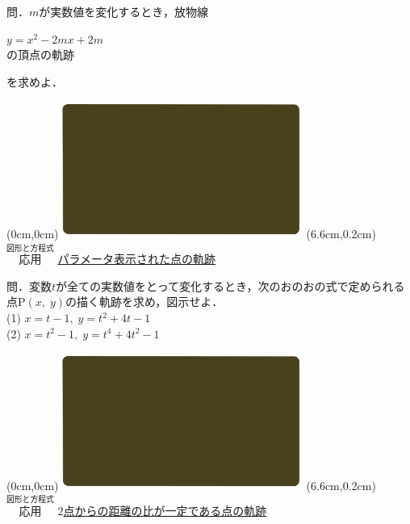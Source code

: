 \documentclass[10pt,
fleqn,
dvipdfmx,
uplatex
]{jsarticle}
\begin{document}
\large 
問．$m$が実数値を変化するとき，放物線

\huge
\vspace{-0.0zw}
\hspace{0.1zw}$y=x^2-2mx+2m$\vspace{-0.0zw}\\
\hfill の頂点の軌跡\hspace{0.4zw}

\large 
\vspace{0.2zw}
\hfill を求めよ．

\newpage

\at(0cm,0cm){\includegraphics[width=8cm,bb=0 0 1920 1080]{./youtube/thumbnails/templates/smart_background/図形と方程式.jpeg}}
\at(6.6cm,0.2cm){\small\color{bradorange}$\overset{\text{図形と方程式}}{\text{応用}}$}
{\color{orange}\Large\underline{パラメータ表示された点の軌跡}}\vspace{0.3zw}

\normalsize 
問．変数$t$が全ての実数値をとって変化するとき，次のおのおの式で定められる点$\text{P}\left(x,\;y\right)$の描く軌跡を求め，図示せよ．\\
(1)  $x=t-1,\;y=t^2+4t-1$\\
(2)  $x=t^2-1,\;y=t^4+4t^2-1$\\

\newpage

\at(0cm,0cm){\includegraphics[width=8cm,bb=0 0 1920 1080]{./youtube/thumbnails/templates/smart_background/図形と方程式.jpeg}}
\at(6.6cm,0.2cm){\small\color{bradorange}$\overset{\text{図形と方程式}}{\text{応用}}$}
{\color{orange}\large\underline{$2$点からの距離の比が一定である点の軌跡}}\vspace{0.3zw}
\end{document}

